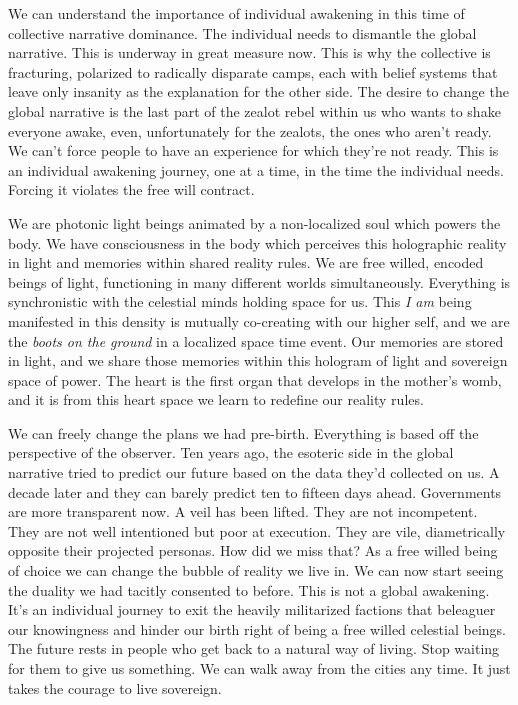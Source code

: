 We can understand the importance of individual awakening in this time of
collective narrative dominance. The individual needs to dismantle the
global narrative. This is underway in great measure now. This is why the
collective is fracturing, polarized to radically disparate camps, each
with belief systems that leave only insanity as the explanation for the
other side. The desire to change the global narrative is the last part
of the zealot rebel within us who wants to shake everyone awake, even,
unfortunately for the zealots, the ones who aren't ready. We can't force
people to have an experience for which they're not ready. This is an
individual awakening journey, one at a time, in the time the individual
needs. Forcing it violates the free will contract.

We are photonic light beings animated by a non-localized soul which
powers the body. We have consciousness in the body which perceives this
holographic reality in light and memories within shared reality rules.
We are free willed, encoded beings of light, functioning in many
different worlds simultaneously. Everything is synchronistic with the
celestial minds holding space for us. This \emph{I am} being manifested
in this density is mutually co-creating with our higher self, and we are
the \emph{boots on the ground} in a localized space time event. Our
memories are stored in light, and we share those memories within this
hologram of light and sovereign space of power. The heart is the first
organ that develops in the mother's womb, and it is from this heart
space we learn to redefine our reality rules.

We can freely change the plans we had pre-birth. Everything is based off
the perspective of the observer. Ten years ago, the esoteric side in the
global narrative tried to predict our future based on the data they'd
collected on us. A decade later and they can barely predict ten to
fifteen days ahead. Governments are more transparent now. A veil has
been lifted. They are not incompetent. They are not well intentioned but
poor at execution. They are vile, diametrically opposite their projected
personas. How did we miss that? As a free willed being of choice we can
change the bubble of reality we live in. We can now start seeing the
duality we had tacitly consented to before. This is not a global
awakening. It's an individual journey to exit the heavily militarized
factions that beleaguer our knowingness and hinder our birth right of
being a free willed celestial beings. The future rests in people who get
back to a natural way of living. Stop waiting for them to give us
something. We can walk away from the cities any time. It just takes the
courage to live sovereign.

